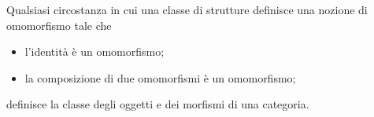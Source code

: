\begin{example}
\end{example}
\begin{example}
\end{example}
\begin{example}
\end{example}
\begin{example}
\end{example}
\begin{example}
\end{example}
\begin{example}
\end{example}
\begin{example}
\end{example}
\begin{example}
\end{example}

Qualsiasi circostanza in cui una classe di strutture definisce una nozione di omomorfismo tale che
\begin{itemize}
    \item l'identità è un omomorfismo;
    \item la composizione di due omomorfismi è un omomorfismo;
\end{itemize}
definisce la classe degli oggetti e dei morfismi di una categoria.


